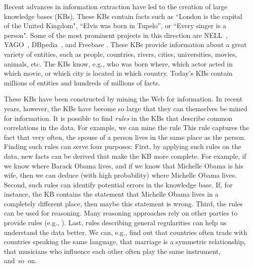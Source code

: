 Recent advances in information extraction have led to the creation of large knowledge bases (KBs).
These KBs contain facts such as
 ``London is the capital of the United Kingdom", ``Elvis was born in Tupelo'', or ``Every singer is a person".
Some of the most prominent projects in this direction are NELL~\cite{carlson-aaai}, YAGO~\cite{SucKasWei07}, DBpedia~\cite{dbpedia}, and Freebase \cite{freebase}. %
These KBs provide information about a great variety of entities, such as people, countries, rivers, cities, universities, movies, animals, etc.
The KBs know, e.g., who was born where, which actor acted in which movie, or which city is located in which country. Today's KBs contain millions of entities and hundreds of millions of facts.

These KBs have been constructed by mining the Web for information.
In recent years, however, the KBs have become so large that they can themselves be mined for information.
It is possible to find \emph{rules} in the KBs that describe common correlations in the data. For example, we can mine the rule
This rule captures the fact that very often, the spouse of a person lives in the same place as the person.
Finding such rules can serve four purposes: First, by applying such rules on the data, new facts can be derived that make the KB more complete.
For example, if we know where Barack Obama lives, and if we know that Michelle Obama is his wife, then we can deduce (with high probability) where Michelle Obama lives.
Second, such rules can identify potential errors in the knowledge base. If, for instance, the KB contains the statement that Michelle Obama lives in a completely different place, then maybe this statement is wrong.
Third, the rules can be used for reasoning. Many reasoning approaches rely on other parties to provide rules (e.g., \cite{markovlogic,urdf}).
Last, rules describing general regularities can help us understand the data better.
We can, e.g., find out that countries often trade with countries speaking the same language, that marriage is a symmetric relationship, that musicians who influence each other often play the same instrument, and~so~on.

